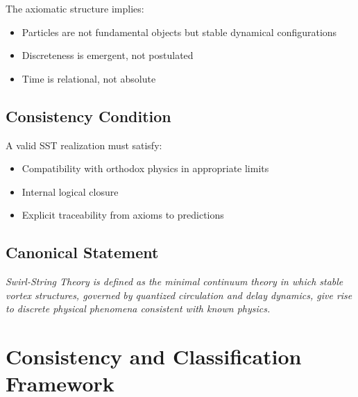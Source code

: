 \documentclass[11pt]{article}
\theoremstyle{definition}
\theoremstyle{plain}
\theoremstyle{remark}
\begin{document}
        The axiomatic structure implies:
        
        \begin{itemize}
            \item Particles are not fundamental objects but stable dynamical configurations
            \item Discreteness is emergent, not postulated
            \item Time is relational, not absolute
        \end{itemize}
    
    \subsection{Consistency Condition}
        
        A valid SST realization must satisfy:
        
        \begin{itemize}
            \item Compatibility with orthodox physics in appropriate limits
            \item Internal logical closure
            \item Explicit traceability from axioms to predictions
        \end{itemize}
    
    \subsection{Canonical Statement}
        
        \begin{center}
            \textit{
                Swirl-String Theory is defined as the minimal continuum theory in which stable vortex structures, governed by quantized circulation and delay dynamics, give rise to discrete physical phenomena consistent with known physics.
            }
        \end{center}

        
\section{Consistency and Classification Framework}
    \label{sec:consistency}
    
\end{document}
